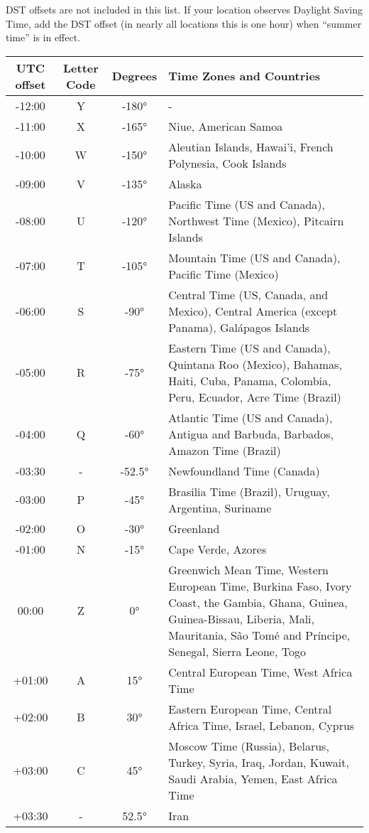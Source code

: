 DST offsets are not included in this list.  If your location observes Daylight Saving Time, add the DST offset (in nearly all locations this is one hour) when “summer time” is in effect.

\begin{footnotesize}
\begin{tabular}{c | c | c | p{}}
	UTC offset & Letter Code & Degrees & Time Zones and Countries\\\hline
	-12:00&Y&-180°& - \\\hline
	-11:00&X&-165°&Niue, American Samoa\\\hline
	-10:00&W&-150°&Aleutian Islands, Hawai'i, French Polynesia, Cook Islands\\\hline
	-09:00&V&-135°&Alaska\\\hline
	-08:00&U&-120°&Pacific Time (US and Canada), Northwest Time (Mexico), Pitcairn Islands\\\hline
	-07:00&T&-105°&Mountain Time (US and Canada), Pacific Time (Mexico)\\\hline
	-06:00&S&-90°&Central Time (US, Canada, and Mexico), Central America (except Panama), Galápagos Islands\\\hline
	-05:00&R&-75°&Eastern Time (US and Canada), Quintana Roo (Mexico), Bahamas, Haiti, Cuba, Panama, Colombia, Peru, Ecuador, Acre Time (Brazil) \\\hline
	-04:00&Q&-60°&Atlantic Time (US and Canada), Antigua and Barbuda, Barbados, Amazon Time (Brazil)\\\hline
	-03:30& - &-52.5°&Newfoundland Time (Canada)\\\hline
	-03:00&P&-45°&Brasilia Time (Brazil), Uruguay, Argentina, Suriname\\\hline
	-02:00&O&-30°&Greenland\\\hline
	-01:00&N&-15°&Cape Verde, Azores\\\hline
	00:00&Z&0°&Greenwich Mean Time, Western European Time, Burkina Faso, Ivory Coast, the Gambia, Ghana, Guinea, Guinea-Bissau, Liberia, Mali, Mauritania, São Tomé and Príncipe, Senegal, Sierra Leone, Togo\\\hline
	+01:00&A&15°&Central European Time, West Africa Time\\\hline
	+02:00&B&30°&Eastern European Time, Central Africa Time, Israel, Lebanon, Cyprus\\\hline
	+03:00&C&45°&Moscow Time (Russia), Belarus, Turkey, Syria, Iraq, Jordan, Kuwait, Saudi Arabia, Yemen, East Africa Time\\\hline
	+03:30& - &52.5°&Iran\\\hline

\end{tabular}
\end{footnotesize}
